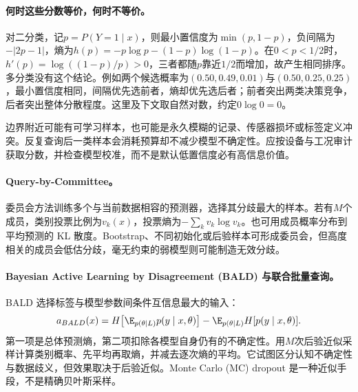 \paragraph{何时这些分数等价，何时不等价。}
对二分类，记$p=P(Y=1\mid x)$，则最小置信度为$\min(p,1-p)$，负间隔为$-|2p-1|$，熵为$h(p)=-p\log p-(1-p)\log(1-p)$。在$0<p<1/2$时，$h'(p)=\log((1-p)/p)>0$，三者都随$p$靠近$1/2$而增加，故产生相同排序。多分类没有这个结论。例如两个候选概率为$(0.50,0.49,0.01)$与$(0.50,0.25,0.25)$，最小置信度相同，间隔优先选前者，熵却优先选后者；前者突出两类决策竞争，后者突出整体分散程度。这里及下文取自然对数，约定$0\log0=0$。

边界附近可能有可学习样本，也可能是永久模糊的记录、传感器损坏或标签定义冲突。反复查询后一类样本会消耗预算却不减少模型不确定性。应按设备与工况审计获取分数，并检查模型校准，而不是默认低置信度必有高信息价值。

\paragraph{Query-by-Committee。}
委员会方法训练多个与当前数据相容的预测器，选择其分歧最大的样本\cite{seung1992qbc}。若有$M$个成员，类别投票比例为$v_k(x)$，投票熵为$-\sum_kv_k\log v_k$。也可用成员概率分布到平均预测的 KL 散度。Bootstrap、不同初始化或后验样本可形成委员会，但高度相关的成员会低估分歧，毫无约束的弱模型则可能制造无效分歧。

\paragraph{Bayesian Active Learning by Disagreement (BALD) 与联合批量查询。}
BALD 选择标签与模型参数间条件互信息最大的输入\cite{houlsby2011bald}：
\begin{equation}
 a_{BALD}(x)=H\!\left[\E_{p(\theta\mid L)}p(y\mid x,\theta)\right]
 -\E_{p(\theta\mid L)}H[p(y\mid x,\theta)].
\end{equation}
第一项是总体预测熵，第二项扣除各模型自身仍有的不确定性。用$M$次后验近似采样计算类别概率、先平均再取熵，并减去逐次熵的平均。它试图区分认知不确定性与数据歧义，但效果取决于后验近似。Monte Carlo (MC) dropout 是一种近似手段，不是精确贝叶斯采样\cite{gal2017deepactive}。

